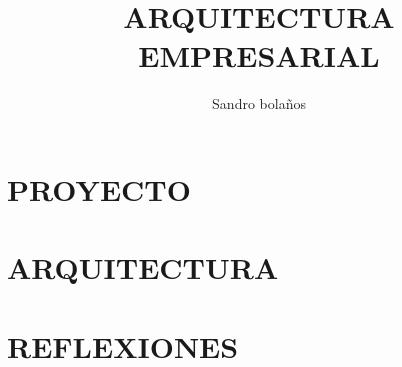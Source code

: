 \documentclass[11pt,letterpaper]{book}
\title{ARQUITECTURA EMPRESARIAL}
\author{Sandro bolaños}
\begin{document}
\maketitle
\tableofcontents
\listoffigures

\part{PROYECTO}



\part{ARQUITECTURA}















\part{REFLEXIONES}



\end{document}
